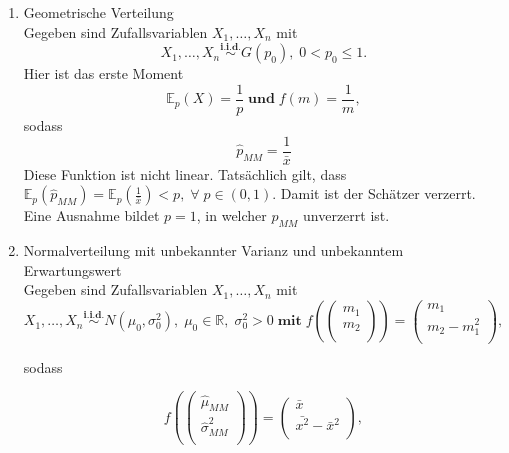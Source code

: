 \documentclass[10pt]{article}
\newcommand{\FZV}{X_1, \ldots, X_n} %
\newcommand{\IR}{\mathbb{R}} %
\newcommand{\EW}{\mathbb{E}} %
\begin{document}
\begin{enumerate}
\begin{enumerate}[label = (\roman*)]
			\item Geometrische Verteilung \\
		Gegeben sind Zufallsvariablen $\FZV$ mit
		\begin{equation*}
			\FZV \overset{\textbf{i.i.d.}}{\sim} G(p_0), \; 0 < p_0 \leq 1.
		\end{equation*} 
		Hier ist das erste Moment
		\begin{equation*}
			\EW_p(X) = \frac{1}{p} \; \textbf{und} \;			f(m)=\frac{1}{m},
		\end{equation*}
		sodass
		\begin{equation*}
			\hat{p}_{MM} = \frac{1}{\bar{x}}
		\end{equation*}
		Diese Funktion ist nicht linear. Tatsächlich gilt, dass $\EW_p(\hat{p}_{MM}) = \EW_p (\frac{1}{\bar{x}}) < p, \; \forall  \; p \in (0,1)$. Damit ist der Schätzer verzerrt. Eine Ausnahme bildet $ p = 1 $, in welcher $\hat{p}_{MM}$  unverzerrt ist.
		
		\item Normalverteilung mit unbekannter Varianz und unbekanntem Erwartungswert\\
		Gegeben sind Zufallsvariablen $\FZV$ mit
		\begin{equation*}
			\FZV \overset{\textbf{i.i.d.}} {\sim} N(\mu_0,\sigma_0^2),\; \mu_0 \in \IR, \; \sigma_0^2 >0 \; \textbf{mit} \; 	f(\left(
			\begin{array}{c}
				m_1\\
				m_2\\
			\end{array}
			\right)) = 
			\left(
			\begin{array}{c}
				m_1\\
				m_2 - m_1^2\\
			\end{array}
			\right),
		\end{equation*} 
		
		sodass
		
		\begin{equation*}
			f(\left(
			\begin{array}{c}
				\hat{\mu}_{MM}\\
				\hat{\sigma}^2_{MM}\\
			\end{array}
			\right)) = 
			\left(
			\begin{array}{c}
				\bar{x}\\
				\bar{x^2}-\bar{x}^2\\
			\end{array}
			\right),
		\end{equation*}
		

\end{enumerate}
\end{enumerate}
\end{document}
